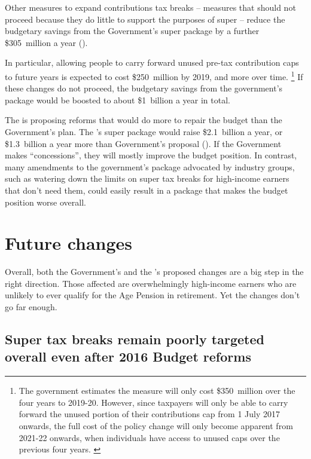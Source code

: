 \documentclass[continuous]{grattan}\usepackage[]{graphicx}\usepackage[]{color}
\begin{document}
Other measures to expand contributions tax breaks -- measures that should not proceed because they do little to support the purposes of super -- reduce the budgetary savings from the Government’s super package by a further \$305~million a year (). 

In particular, allowing people to carry forward unused pre-tax contribution caps to future years is expected to cost \$250~million by 2019, and more over time.%
\footnote{%
The government estimates the measure will only cost \$350~million over the four years to 2019-20. 
However, since taxpayers will only be able to carry forward the unused portion of their contributions cap from 1 July 2017 onwards, the full cost of the policy change will only become apparent from 2021-22 onwards, when individuals have access to unused caps over the previous four years. 
\textcite{DaleyCoates2016-theConvo-Super-changes-could-benefit-rich}
} %
If these changes do not proceed, the budgetary savings from the government’s package would be boosted to about \$1~billion a year in total. 

The \ALP{} is proposing reforms that would do more to repair the budget than the Government’s plan. 
The \ALP{}’s super package would raise \$2.1~billion a year, or  \$1.3~billion a year more than Government’s proposal (). 
If the Government makes “concessions”, they will mostly improve the budget position. 
In contrast, many amendments to the government’s package advocated by industry groups, such as watering down the limits on super tax breaks for high-income earners that don’t need them, could easily result in a package that makes the budget position worse overall. 

\chapter{Future changes\label{chap:future-changes}}
Overall, both the Government’s and the \ALP{}’s proposed changes are a big step in the right direction. 
Those affected are overwhelmingly high-income earners who are unlikely to ever qualify for the Age Pension in retirement. 
Yet the changes don’t go far enough.

\section{Super tax breaks remain poorly targeted overall even after 2016 Budget reforms}\label{sec:super-tax-breaks-remain-poorly-targeted-overall-even-after-2016-budget-reforms}
\end{document}
